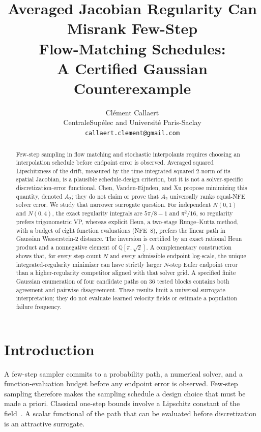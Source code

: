 \documentclass[11pt,a4paper]{article}
\title{Averaged Jacobian Regularity Can Misrank Few-Step\\
Flow-Matching Schedules:\\
A Certified Gaussian Counterexample}
\author{%
  Clément Callaert\\
  CentraleSupélec and Université Paris-Saclay\\
  \texttt{callaert.clement@gmail.com}
}
\date{}
\theoremstyle{remark}
\begin{document}
\maketitle

\begin{abstract}
Few-step sampling in flow matching and stochastic interpolants requires
choosing an interpolation schedule before endpoint error is observed.
Averaged squared Lipschitzness of the drift, measured by the
time-integrated squared $2$-norm of its spatial Jacobian, is a plausible
schedule-design criterion, but it is not a solver-specific
discretization-error functional. Chen, Vanden-Eijnden, and Xu propose
minimizing this quantity, denoted $A_2$; they do not claim or prove that
$A_2$ universally ranks equal-NFE solver error. We study that narrower
surrogate question. For independent $N(0,1)$ and $N(0,4)$, the exact
regularity integrals are $5\pi/8-1$ and $\pi^2/16$, so regularity prefers
trigonometric VP, whereas explicit Heun, a two-stage Runge--Kutta method,
with a budget of eight function evaluations (NFE~$8$), prefers the linear
path in Gaussian Wasserstein-2 distance. The inversion is certified by
an exact rational Heun product and a nonnegative element of
$\mathbb{Q}[\pi,\sqrt{2}]$. A complementary construction shows that, for
every step count $N$ and every admissible endpoint log-scale, the unique
integrated-regularity minimizer can have strictly larger $N$-step Euler
endpoint error than a higher-regularity competitor aligned with that
solver grid. A specified finite Gaussian enumeration of four candidate
paths on $36$ tested blocks contains both agreement and pairwise
disagreement. These results limit a universal surrogate interpretation;
they do not evaluate learned velocity fields or estimate a population
failure frequency.
\end{abstract}

\section{Introduction}
\label{sec:intro}

A few-step sampler commits to a probability path, a numerical solver, and a
function-evaluation budget before any endpoint error is observed.
Few-step sampling therefore makes the sampling schedule a design choice
that must be made a priori. Classical one-step bounds
involve a Lipschitz constant of the field~\citep{hairer1993solving}. A
scalar functional of the path that can be evaluated before discretization
is an attractive surrogate.
\end{document}
